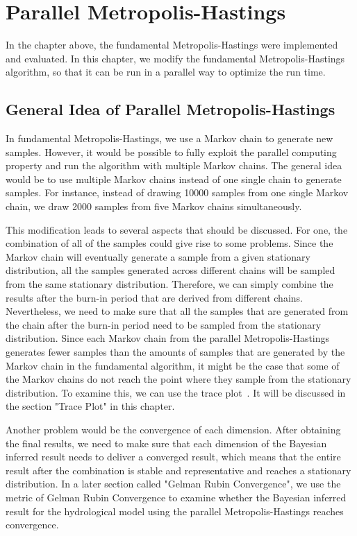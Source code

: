 \chapter{Parallel Metropolis-Hastings}
In the chapter above, the fundamental Metropolis-Hastings were implemented and evaluated. In this chapter, we modify the fundamental Metropolis-Hastings algorithm, so that it can be run in a parallel way to optimize the run time.

\section{General Idea of Parallel Metropolis-Hastings}
In fundamental Metropolis-Hastings, we use a Markov chain to generate new samples. However, it would be possible to fully exploit the parallel computing property and run the algorithm with multiple Markov chains. The general idea would be to use multiple Markov chains instead of one single chain to generate samples. For instance, instead of drawing 10000 samples from one single Markov chain, we draw 2000 samples from five Markov chains simultaneously. 

This modification leads to several aspects that should be discussed. For one, the combination of all of the samples could give rise to some problems. Since the Markov chain will eventually generate a sample from a given stationary distribution, all the samples generated across different chains will be sampled from the same stationary distribution. Therefore, we can simply combine the results after the burn-in period that are derived from different chains. Nevertheless, we need to make sure that all the samples that are generated from the chain after the burn-in period need to be sampled from the stationary distribution. Since each Markov chain from the parallel Metropolis-Hastings generates fewer samples than the amounts of samples that are generated by the Markov chain in the fundamental algorithm, it might be the case that some of the Markov chains do not reach the point where they sample from the stationary distribution. To examine this, we can use the trace plot~\cite{mcmc_practice}. It will be discussed in the section "Trace Plot" in this chapter.

Another problem would be the convergence of each dimension. After obtaining the final results, we need to make sure that each dimension of the Bayesian inferred result needs to deliver a converged result, which means that the entire result after the combination is stable and representative and reaches a stationary distribution. In a later section called "Gelman Rubin Convergence", we use the metric of Gelman Rubin Convergence to examine whether the Bayesian inferred result for the hydrological model using the parallel Metropolis-Hastings reaches convergence.

